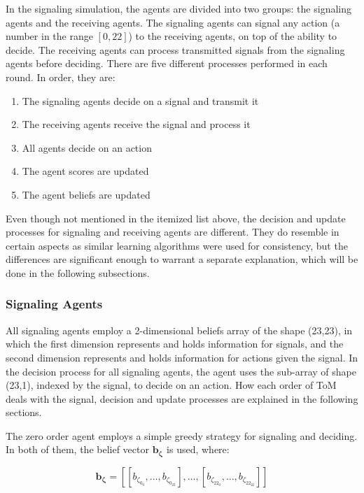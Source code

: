 In the signaling simulation, the agents are divided into two groups: the signaling agents and the receiving agents. The signaling agents can signal any action (a number in the range $[0,22]$) to the receiving agents, on top of the ability to decide. The receiving agents can process transmitted signals from the signaling agents before deciding. There are five different processes performed in each round. In order, they are:

\begin{enumerate}
    \item The signaling agents decide on a signal and transmit it
    \item The receiving agents receive the signal and process it
    \item All agents decide on an action
    \item The agent scores are updated  
    \item The agent beliefs are updated
\end{enumerate}

Even though not mentioned in the itemized list above, the decision and update processes for signaling and receiving agents are different. They do resemble in certain aspects as similar learning algorithms were used for consistency, but the differences are significant enough to warrant a separate explanation, which will be done in the following subsections.

\subsubsection{Signaling Agents}

All signaling agents employ a 2-dimensional beliefs array of the shape (23,23), in which the first dimension represents and holds information for signals, and the second dimension represents and holds information for actions given the signal. In the decision process for all signaling agents, the agent uses the sub-array of shape (23,1), indexed by the signal, to decide on an action. How each order of ToM deals with the signal, decision and update processes are explained in the following sections.


The zero order agent employs a simple greedy strategy for signaling and deciding. In both of them, the belief vector $\mathbf{b_{\zeta}}$ is used, where: 

\[
\mathbf{b_{\zeta}} = [[b_{\zeta_{0_{0}}}, \ldots, b_{\zeta_{0_{22}}}], \ldots, [b_{\zeta_{22_{0}}}, \ldots, b_{\zeta_{22_{22}}}]]
\]


